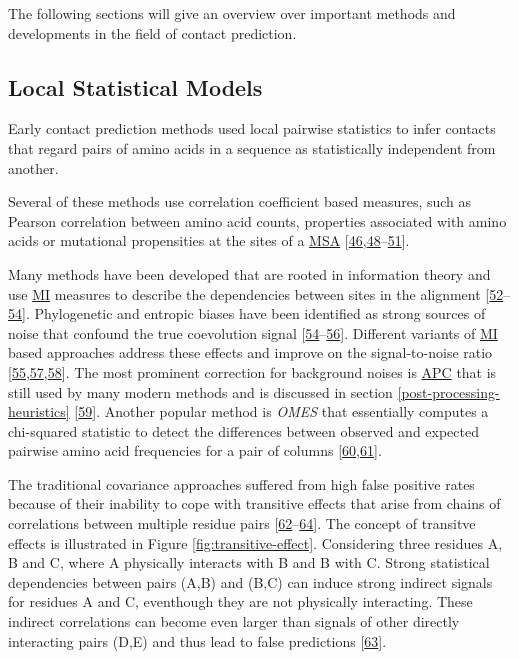 \documentclass[11pt,a4paper,twoside]{book}
\theoremstyle{definition}
\theoremstyle{definition}
\theoremstyle{remark}
\begin{document}
The following sections will give an overview over important methods and
developments in the field of contact prediction.

\subsection{Local Statistical Models}\label{local-methods}

Early contact prediction methods used local pairwise statistics to infer
contacts that regard pairs of amino acids in a sequence as statistically
independent from another.

Several of these methods use correlation coefficient based measures,
such as Pearson correlation between amino acid counts, properties
associated with amino acids or mutational propensities at the sites of a
\protect\hyperlink{abbrev}{MSA}
{[}\protect\hyperlink{ref-Gobel1994}{46},\protect\hyperlink{ref-Neher1994}{48}--\protect\hyperlink{ref-Shindyalov1994}{51}{]}.

Many methods have been developed that are rooted in information theory
and use \protect\hyperlink{abbrev}{MI} measures to describe the
dependencies between sites in the alignment
{[}\protect\hyperlink{ref-Clarke1995}{52}--\protect\hyperlink{ref-Martin2005}{54}{]}.
Phylogenetic and entropic biases have been identified as strong sources
of noise that confound the true coevolution signal
{[}\protect\hyperlink{ref-Martin2005}{54}--\protect\hyperlink{ref-Fodor2004}{56}{]}.
Different variants of \protect\hyperlink{abbrev}{MI} based approaches
address these effects and improve on the signal-to-noise ratio
{[}\protect\hyperlink{ref-Atchley2000}{55},\protect\hyperlink{ref-Tillier2003}{57},\protect\hyperlink{ref-Gouveia_Oliveira2007}{58}{]}.
The most prominent correction for background noises is
\protect\hyperlink{abbrev}{APC} that is still used by many modern
methods and is discussed in section \ref{post-processing-heuristics}
{[}\protect\hyperlink{ref-Dunn2008}{59}{]}. Another popular method is
\emph{OMES} that essentially computes a chi-squared statistic to detect
the differences between observed and expected pairwise amino acid
frequencies for a pair of columns
{[}\protect\hyperlink{ref-Kass2002}{60},\protect\hyperlink{ref-Noivirt2005}{61}{]}.

The traditional covariance approaches suffered from high false positive
rates because of their inability to cope with transitive effects that
arise from chains of correlations between multiple residue pairs
{[}\protect\hyperlink{ref-Lapedes1999}{62}--\protect\hyperlink{ref-Weigt2009}{64}{]}.
The concept of transitve effects is illustrated in Figure
\ref{fig:transitive-effect}. Considering three residues A, B and C,
where A physically interacts with B and B with C. Strong statistical
dependencies between pairs (A,B) and (B,C) can induce strong indirect
signals for residues A and C, eventhough they are not physically
interacting. These indirect correlations can become even larger than
signals of other directly interacting pairs (D,E) and thus lead to false
predictions {[}\protect\hyperlink{ref-Burger2010}{63}{]}.
\end{document}

